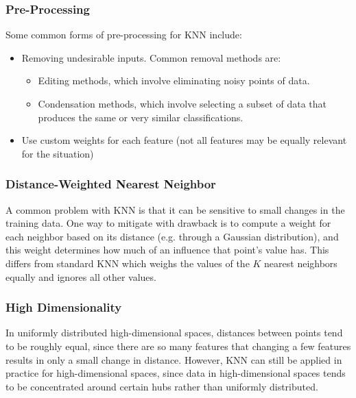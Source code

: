 \documentclass[12pt]{article}
\begin{document}
        \subsubsection{Pre-Processing}
            Some common forms of pre-processing for KNN include:
            \begin{itemize}
              \item Removing undesirable inputs. Common removal methods are:
                \begin{itemize}
                  \item Editing methods, which involve eliminating noisy points of data.
                  \item Condensation methods, which involve selecting a subset of data that produces the same or very
                  similar classifications.
                \end{itemize}
              \item Use custom weights for each feature (not all features may be equally relevant for the situation)
            \end{itemize}

        \subsubsection{Distance-Weighted Nearest Neighbor}
            A common problem with KNN is that it can be sensitive to small changes in the training data. One way to
            mitigate with drawback is to compute a weight for each neighbor based on its distance (e.g. through a
            Gaussian distribution), and this weight determines how much of an influence that point's value has. This
            differs from standard KNN which weighs the values of the $K$ nearest neighbors equally and ignores all other
            values.

        \subsubsection{High Dimensionality}
            In uniformly distributed high-dimensional spaces, distances between points tend to be roughly equal, since
            there are so many features that changing a few features results in only a small change in distance. However,
            KNN can still be applied in practice for high-dimensional spaces, since data in high-dimensional spaces
            tends to be concentrated around certain hubs rather than uniformly distributed.
\end{document}
